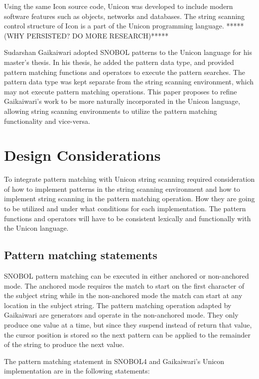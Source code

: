 \documentclass{article}
\begin{document}
Using the same Icon source code, Unicon was developed to include modern software features such as objects, networks and databases. \cite{JefferyUnicon} The string scanning control structure of Icon is a part of the Unicon programming language.  *****(WHY PERSISTED? DO MORE RESEARCH)*****

Sudarshan Gaikaiwari adopted SNOBOL patterns to the Unicon language for his master's thesis.  In his thesis, he added the pattern data type, and provided pattern matching functions and operators to execute the pattern searches.\cite{Gaikaiwari2005}  The pattern data type was kept separate from the string scanning environment, which may not execute pattern matching operations.  This paper proposes to refine Gaikaiwari's work to be more naturally incorporated in the Unicon language, allowing string scanning environments to utilize the pattern matching functionality and vice-versa.

\section{Design Considerations}

To integrate pattern matching with Unicon string scanning required consideration of how to implement patterns in the string scanning environment and how to implement string scanning in the pattern matching operation.  How they are going to be utilized and under what conditions for each implementation.  The pattern functions and operators will have to be consistent lexically and functionally with the Unicon language.

\subsection{Pattern matching statements}
SNOBOL pattern matching can be executed in either anchored or non-anchored mode.  The anchored mode requires the match to start on the first character of the subject string while in the non-anchored mode the match can start at any location in the subject string.\cite{Snobol}  The pattern matching operation adapted by Gaikaiwari are generators and operate in the non-anchored mode.\cite{Gaikaiwari2005}  They only produce one value at a time, but since they suspend instead of return that value, the cursor position is stored so the next pattern can be applied to the remainder of the string to produce the next value. \cite{JefferyUnicon}

The pattern matching statement in SNOBOL4 and Gaikaiwari's Unicon implementation are in the following statements:\\
\end{document}
